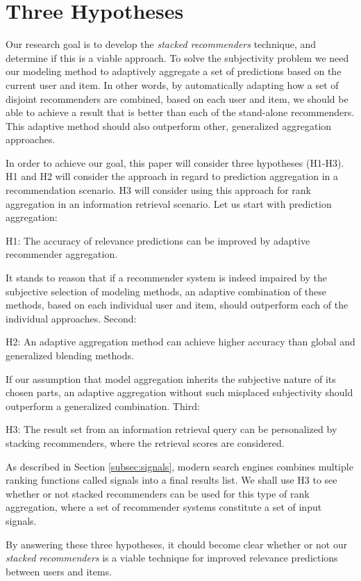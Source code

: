 \section{Three Hypotheses}
\label{sec:hypotheses}

Our research goal is to develop the \emph{stacked recommenders} technique, and determine if this is a viable approach.
To solve the subjectivity problem we need our modeling method
to adaptively aggregate a set of predictions based on the current user and item.
In other words, by automatically adapting how a set of disjoint recommenders
are combined, based on each user and item, we should be able to achieve a
result that is better than each of the stand-alone recommenders.
This adaptive method should also outperform other, generalized aggregation approaches.

In order to achieve our goal, this paper will consider three hypotheses (H1-H3).
H1 and H2 will consider the approach in regard to prediction aggregation
in a recommendation scenario. H3 will consider using this approach for
rank aggregation in an information retrieval scenario.
Let us start with prediction aggregation:

\begin{blockquote}
  H1: The accuracy of relevance predictions can be improved
  by adaptive recommender aggregation.
\end{blockquote}
%
It stands to reason that if a recommender system is indeed impaired
by the subjective selection of modeling methods,
an adaptive combination of these methods, based on each individual user and item, 
should outperform each of the individual approaches.
Second:

\begin{blockquote}
  H2: An adaptive aggregation method can achieve higher accuracy than global and generalized blending methods.
\end{blockquote}
%
If our assumption that model aggregation inherits the subjective nature of its chosen parts,
an adaptive aggregation without such misplaced subjectivity should outperform a
generalized combination.
Third:

\begin{blockquote}
  H3: The result set from an information retrieval query
  can be personalized by stacking recommenders, where the retrieval scores are considered.
\end{blockquote}
%
As described in Section \ref{subsec:signals},
modern search engines combines multiple ranking functions called signals into a final results list.
We shall use H3 to see whether or not stacked recommenders can be used for this type of rank aggregation,
where a set of recommender systems constitute a set of input signals.

By answering these three hypotheses, it chould become clear whether or not
our \emph{stacked recommenders} is a viable technique for improved relevance predictions
between users and items.

